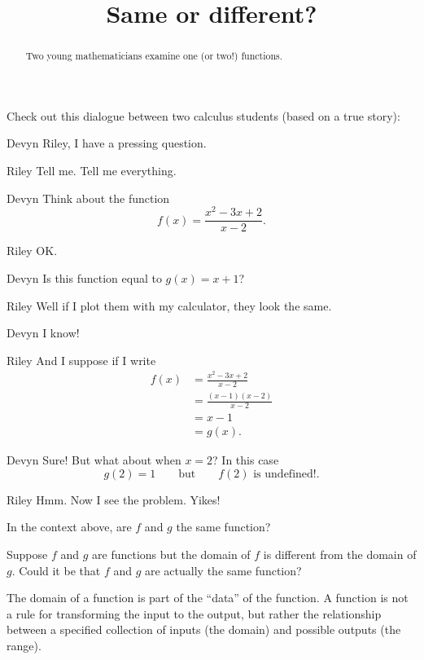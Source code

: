 \documentclass{ximera}
\title[Break-Ground:]{Same or different?}
\begin{document}
\begin{abstract}
  Two young mathematicians examine one (or two!)  functions.
\end{abstract}
\maketitle

Check out this dialogue between two calculus students (based on a true
story):

\begin{dialogue}
\item[Devyn] Riley, I have a pressing question.
\item[Riley] Tell me. Tell me everything.
\item[Devyn] Think about the function
  \[
  f(x) = \frac{x^2 - 3x + 2}{x-2}.
  \]
\item[Riley] OK.
\item[Devyn] Is this function equal to $g(x) = x+1$?
\item[Riley] Well if I plot them with my calculator, they look the
  same.
\item[Devyn] I know!
\item[Riley] And I suppose if I write
  \begin{align*}
    f(x) &= \frac{x^2 - 3x + 2}{x-2} \\
    &= \frac{(x-1)(x-2)}{x-2} \\
    &= x-1 \\
    &= g(x).
  \end{align*}
\item[Devyn] Sure! But what about when $x=2$? In this case
  \[
  g(2) = 1\qquad\text{but}\qquad f(2) \text{ is undefined!}.
  \]
\item[Riley] Hmm. Now I see the problem. Yikes!
\end{dialogue}

\begin{problem}
  In the context above, are $f$ and $g$ the same function?
  \begin{multipleChoice}
  \end{multipleChoice}
\end{problem}



\begin{problem}
  Suppose $f$ and $g$ are functions but the domain of $f$ is different
  from the domain of $g$.  Could it be that $f$ and $g$ are actually
  the same function?

  \begin{multipleChoice}
  \end{multipleChoice}

  \begin{feedback}
    The domain of a function is part of the ``data'' of the function.
    A function is not a rule for transforming the input to the output,
    but rather the relationship between a specified collection of
    inputs (the domain) and possible outputs (the range).
  \end{feedback}
\end{problem}
\end{document}
